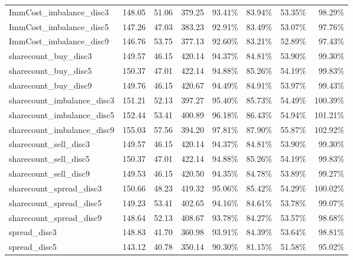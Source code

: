 \begin{table}[ht]
{\begin{tabular}{lRRR|RRRR}
ImmCost\_imbalance\_disc3      &    148.05 &   51.06 &  379.25 &   93.41\% &   83.94\% &   53.35\% &       98.29\% \\
ImmCost\_imbalance\_disc5      &    147.26 &   47.03 &  383.23 &   92.91\% &   83.49\% &   53.07\% &       97.76\% \\
ImmCost\_imbalance\_disc9      &    146.76 &   53.75 &  377.13 &   92.60\% &   83.21\% &   52.89\% &       97.43\% \\
sharecount\_buy\_disc3         &    149.57 &   46.15 &  420.14 &   94.37\% &   84.81\% &   53.90\% &       99.30\% \\
sharecount\_buy\_disc5         &    150.37 &   47.01 &  422.14 &   94.88\% &   85.26\% &   54.19\% &       99.83\% \\
sharecount\_buy\_disc9         &    149.76 &   46.15 &  420.67 &   94.49\% &   84.91\% &   53.97\% &       99.43\% \\
sharecount\_imbalance\_disc3   &    151.21 &   52.13 &  397.27 &   95.40\% &   85.73\% &   54.49\% &      100.39\% \\
sharecount\_imbalance\_disc5   &    152.44 &   53.41 &  400.89 &   96.18\% &   86.43\% &   54.94\% &      101.21\% \\
sharecount\_imbalance\_disc9   &    155.03 &   57.56 &  394.20 &   97.81\% &   87.90\% &   55.87\% &      102.92\% \\
sharecount\_sell\_disc3        &    149.57 &   46.15 &  420.14 &   94.37\% &   84.81\% &   53.90\% &       99.30\% \\
sharecount\_sell\_disc5        &    150.37 &   47.01 &  422.14 &   94.88\% &   85.26\% &   54.19\% &       99.83\% \\
sharecount\_sell\_disc9        &    149.53 &   46.15 &  420.50 &   94.35\% &   84.78\% &   53.89\% &       99.27\% \\
sharecount\_spread\_disc3      &    150.66 &   48.23 &  419.32 &   95.06\% &   85.42\% &   54.29\% &      100.02\% \\
sharecount\_spread\_disc5      &    149.23 &   53.41 &  402.65 &   94.16\% &   84.61\% &   53.78\% &       99.07\% \\
sharecount\_spread\_disc9      &    148.64 &   52.13 &  408.67 &   93.78\% &   84.27\% &   53.57\% &       98.68\% \\
spread\_disc3                 &    148.83 &   41.70 &  360.98 &   93.91\% &   84.39\% &   53.64\% &       98.81\% \\
spread\_disc5                 &    143.12 &   40.78 &  350.14 &   90.30\% &   81.15\% &   51.58\% &       95.02\% \\

\end{tabular}}
\end{table}
